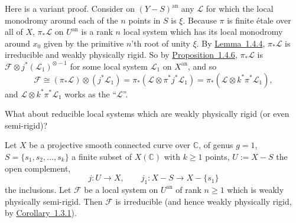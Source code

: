 \setcounter{theorem}{16}
\begin{remark}
\label{rem:1.4.17}
Here is a variant proof. Consider on \((Y-S)^{\mathrm{an}}\) any
\(\mathcal{L}\) for which the local monodromy around each of the \(n\) points
in \(S\) is \(\xi\). Because \(\pi\) is finite étale over all of \(X\),
\(\pi_*\mathcal{L}\) on \(U^{\mathrm{an}}\) is a rank \(n\) local system which
has its local monodromy around \(x_0\) given by the primitive \(n\)'th root of
unity \(\xi\). By \hyperref[lem:1.4.4]{Lemma~1.4.4}, \(\pi_*\mathcal{L}\) is irreducible and weakly
physically rigid. So by \hyperref[prop:1.4.6]{Proposition~1.4.6}, \(\pi_*\mathcal{L}\) is
\(\mathcal{F}\otimes j^*(\mathcal{L}_1)^{\otimes -1}\) for some local system
\(\mathcal{L}_1\) on \(X^{\mathrm{an}}\), and so
\[
  \mathcal{F}
  \cong
  (\pi_*\mathcal{L})\otimes(j^*\mathcal{L}_1)
  =
  \pi_*(\mathcal{L}\otimes \pi^*j^*\mathcal{L}_1)
  =
  \pi_*(\mathcal{L}\otimes k^*\pi^*\mathcal{L}_1),
\]
and \(\mathcal{L}\otimes k^*\pi^*\mathcal{L}_1\) works as the
``\(\mathcal{L}\)''.
\end{remark}

What about reducible local systems which are weakly physically rigid (or even
semi-rigid)?

\setcounter{theorem}{18}
\begin{lemma}
\label{lem:1.4.19}
Let \(X\) be a projective smooth connected curve over \(\mathbb{C}\), of genus
\(g=1\), \(S=\{s_1,s_2,\ldots,s_k\}\) a finite subset of \(X(\mathbb{C})\) with
\(k\geq 1\) points, \(U:=X-S\) the open complement,
\[
  j:U\to X,\qquad j_1:X-S\to X-\{s_1\}
\]
the inclusions. Let \(\mathcal{F}\) be a local system on \(U^{\mathrm{an}}\) of
rank \(n\geq 1\) which is weakly physically semi-rigid. Then \(\mathcal{F}\) is
irreducible (and hence weakly physically rigid, by
\hyperref[cor:1.3.1]{Corollary~1.3.1}).
\end{lemma}


